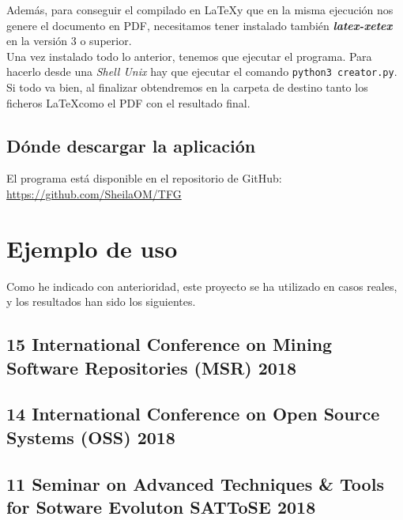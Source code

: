 \documentclass[a4paper, 12pt]{book}
\begin{document}
Además, para conseguir el compilado en \LaTeX y que en la misma ejecución nos genere el documento en PDF, necesitamos tener instalado también \textbf{\textit{latex-xetex}} en la versión 3 o superior.\\

Una vez instalado todo lo anterior, tenemos que ejecutar el programa. Para hacerlo desde una \textit{Shell Unix} hay que ejecutar el comando \texttt{python3 creator.py}. Si todo va bien, al finalizar obtendremos en la carpeta de destino tanto los ficheros \LaTeX como el PDF con el resultado final.

\section{Dónde descargar la aplicación}
\label{sec:descarga_aplicacion}
El programa está disponible en el repositorio de GitHub:\\
\url{https://github.com/SheilaOM/TFG}


\cleardoublepage
\chapter{Ejemplo de uso}
\label{app:ejemplos}
Como he indicado con anterioridad, este proyecto se ha utilizado en casos reales, y los resultados han sido los siguientes.

\newpage
\section{15 International Conference on Mining Software Repositories (MSR) 2018}
\label{MSR}



\section{14 International Conference on Open Source Systems (OSS) 2018}
\label{OSS}



\section{11 Seminar on Advanced Techniques \& Tools for Sotware Evoluton SATToSE 2018}
\label{SATToSE}



\end{document}
